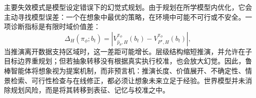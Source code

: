 主要失效模式是模型设定错误下的幻觉式规划。由于规划在所学模型内优化，它会主动寻找模型误差：一个在想象中最优的策略，在环境中可能不可行或不安全。一项诊断指标是有限时域价值差：
\begin{equation}
    \Delta_H(\pi_\phi;b_t)
    =
    \left|
    V_{\widehat p_\theta,H}^{\pi_\phi}(b_t)
    -
    V_{P^\star,H}^{\pi_\phi}(b_t)
    \right|,
    \label{eq:model-misspecification-error}
\end{equation}
当推演离开数据支持区域时，这一差距可能增长。层级结构缩短推演，并允许在子目标边界重规划；但若抽象转移没有根据真实执行校准，也会放大幻觉。因此，鲁棒智能体将想象视为提案机制，而非预言机：推演长度、价值展开、不确定性、情景检索、可行性检查与在线修正，都必须让想象未来立足于经验\citep{talvitie2017self,jafferjee2020hallucinating}。世界模型并未消除规划风险，而是将其转移到表征、记忆与校准之中。
